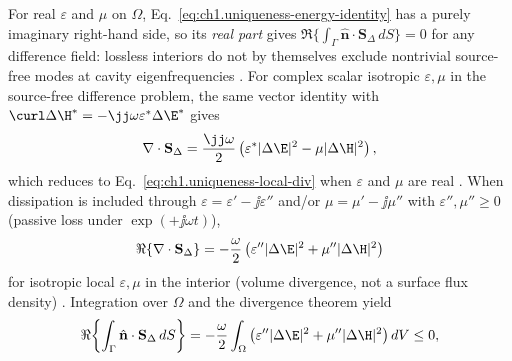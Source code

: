 For real $\varepsilon$ and $\mu$ on $\Omega$, Eq.~\eqref{eq:ch1.uniqueness-energy-identity} has a purely imaginary right-hand side, so its \emph{real part} gives $\Re\{\int_{\Gamma}\hat{\mathbf{n}}\cdot\mathbf{S}_\Delta\,dS\}=0$ for any difference field: lossless interiors do not by themselves exclude nontrivial source-free modes at cavity eigenfrequencies \cite{stratton1941}. For complex scalar isotropic $\varepsilon,\mu$ in the source-free difference problem, the same vector identity with $\curl\Delta\H^*=-\jj\omega\varepsilon^*\Delta\E^*$ gives
\begin{equation}
\label{eq:ch1.uniqueness-local-div-complex}
\nabla\cdot\mathbf{S}_\Delta
=\frac{\jj\omega}{2}\left(\varepsilon^*|\Delta\E|^{2}-\mu|\Delta\H|^{2}\right),
\end{equation}
which reduces to Eq.~\eqref{eq:ch1.uniqueness-local-div} when $\varepsilon$ and $\mu$ are real \cite{stratton1941,harrington2001}. When dissipation is included through $\varepsilon=\varepsilon'-\jj\varepsilon''$ and/or $\mu=\mu'-\jj\mu''$ with $\varepsilon'',\mu''\ge0$ (passive loss under $\exp(+\jj\omega t)$),
\[
\Re\{\nabla\cdot\mathbf{S}_\Delta\}
=-\frac{\omega}{2}\left(\varepsilon''|\Delta\E|^{2}+\mu''|\Delta\H|^{2}\right)
\]
for isotropic local $\varepsilon,\mu$ in the interior (volume divergence, not a surface flux density) \cite{stratton1941,harrington2001}. Integration over $\Omega$ and the divergence theorem yield
\[
\Re\!\left\{\int_{\Gamma}\hat{\mathbf{n}}\cdot\mathbf{S}_\Delta\,dS\right\}
=-\frac{\omega}{2}\int_{\Omega}\left(\varepsilon''|\Delta\E|^{2}+\mu''|\Delta\H|^{2}\right)dV
\le 0,
\]
